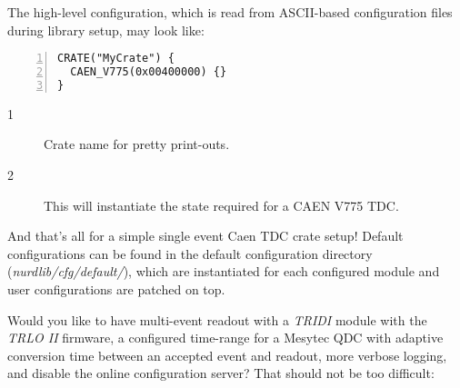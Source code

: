 \documentclass{article}
\begin{document}
The high-level configuration, which is read from ASCII-based configuration
files during library setup, may look like:

\begin{Verbatim}[frame=single,numbers=left]
CRATE("MyCrate") {
  CAEN_V775(0x00400000) {}
}
\end{Verbatim}

\begin{description}
\item[1] Crate name for pretty print-outs.
\item[2] This will instantiate the state required for a CAEN V775 TDC.
\end{description}

And that's all for a simple single event Caen TDC crate setup! Default
configurations can be found in the default configuration directory
(\emph{nurdlib/cfg/default/}), which are instantiated for each configured
module and user configurations are patched on top.

Would you like to have multi-event readout with a \emph{TRIDI} module with the
\emph{TRLO II} firmware, a configured time-range for a Mesytec QDC with
adaptive conversion time between an accepted event and readout, more verbose
logging, and disable the online configuration server? That should not be too
difficult:
\end{document}

